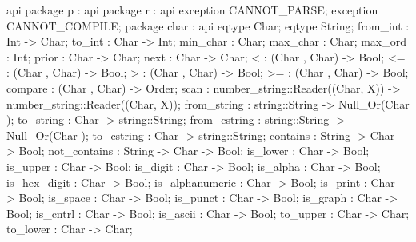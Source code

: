 api {   package p
          : api {   package r
                      : api {
                            exception CANNOT_PARSE;
                            exception CANNOT_COMPILE;
                                package char
                                  : api {
                                        eqtype Char;
                                        eqtype String;
                                        from_int : Int -> Char;
                                        to_int : Char -> Int;
                                        min_char : Char;
                                        max_char : Char;
                                        max_ord : Int;
                                        prior : Char -> Char;
                                        next : Char -> Char;
                                        < : (Char , Char) -> Bool;
                                        <= : (Char , Char) -> Bool;
                                        > : (Char , Char) -> Bool;
                                        >= : (Char , Char) -> Bool;
                                        compare : (Char , Char) -> Order;
                                        scan : number_string::Reader((Char, X)) -> number_string::Reader((Char, X));
                                        from_string : string::String -> Null_Or(Char );
                                        to_string : Char -> string::String;
                                        from_cstring : string::String -> Null_Or(Char );
                                        to_cstring : Char -> string::String;
                                        contains : String -> Char -> Bool;
                                        not_contains : String -> Char -> Bool;
                                        is_lower : Char -> Bool;
                                        is_upper : Char -> Bool;
                                        is_digit : Char -> Bool;
                                        is_alpha : Char -> Bool;
                                        is_hex_digit : Char -> Bool;
                                        is_alphanumeric : Char -> Bool;
                                        is_print : Char -> Bool;
                                        is_space : Char -> Bool;
                                        is_punct : Char -> Bool;
                                        is_graph : Char -> Bool;
                                        is_cntrl : Char -> Bool;
                                        is_ascii : Char -> Bool;
                                        to_upper : Char -> Char;
                                        to_lower : Char -> Char;
}}}}
